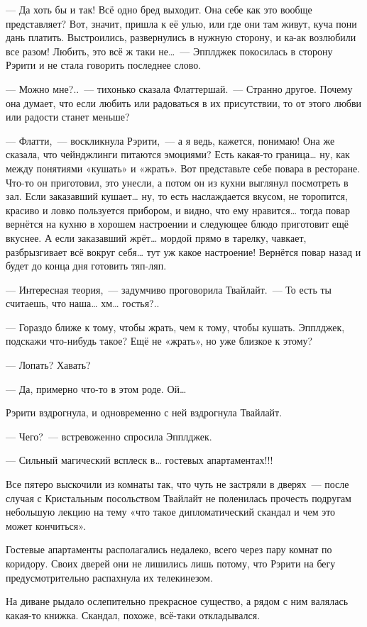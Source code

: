 \documentclass[twoside,a5paper,12pt]{extbook}
\begin{document}
— Да хоть бы и так! Всё одно бред выходит. Она себе как это вообще представляет? Вот, значит, пришла к её улью, или где они там живут, куча пони дань платить. Выстроились, развернулись в нужную сторону, и ка-ак возлюбили все разом! Любить, это всё ж таки не… — Эпплджек покосилась в сторону Рэрити и не стала говорить последнее слово.

— Можно мне?.. — тихонько сказала Флаттершай. — Странно другое. Почему она думает, что если любить или радоваться в их присутствии, то от этого любви или радости станет меньше?

— Флатти, — воскликнула Рэрити, — а я ведь, кажется, понимаю! Она же сказала, что чейнджлинги питаются эмоциями? Есть какая-то граница… ну, как между понятиями «кушать» и «жрать». Вот представьте себе повара в ресторане. Что-то он приготовил, это унесли, а потом он из кухни выглянул посмотреть в зал. Если заказавший кушает… ну, то есть наслаждается вкусом, не торопится, красиво и ловко пользуется прибором, и видно, что ему нравится… тогда повар вернётся на кухню в хорошем настроении и следующее блюдо приготовит ещё вкуснее. А если заказавший жрёт… мордой прямо в тарелку, чавкает, разбрызгивает всё вокруг себя… тут уж какое настроение! Вернётся повар назад и будет до конца дня готовить тяп-ляп.

— Интересная теория, — задумчиво проговорила Твайлайт. — То есть ты считаешь, что наша… хм… гостья?..

— Гораздо ближе к тому, чтобы жрать, чем к тому, чтобы кушать. Эпплджек, подскажи что-нибудь такое? Ещё не «жрать», но уже близкое к этому?

— Лопать? Хавать?

— Да, примерно что-то в этом роде. Ой…

Рэрити вздрогнула, и одновременно с ней вздрогнула Твайлайт.

— Чего? — встревоженно спросила Эпплджек.

— Сильный магический всплеск в… гостевых апартаментах!!!

Все пятеро выскочили из комнаты так, что чуть не застряли в дверях — после случая с Кристальным посольством Твайлайт не поленилась прочесть подругам небольшую лекцию на тему «что такое дипломатический скандал и чем это может кончиться».

Гостевые апартаменты располагались недалеко, всего через пару комнат по коридору. Своих дверей они не лишились лишь потому, что Рэрити на бегу предусмотрительно распахнула их телекинезом.

На диване рыдало ослепительно прекрасное существо, а рядом с ним валялась какая-то книжка. Скандал, похоже, всё-таки откладывался.
\end{document}
